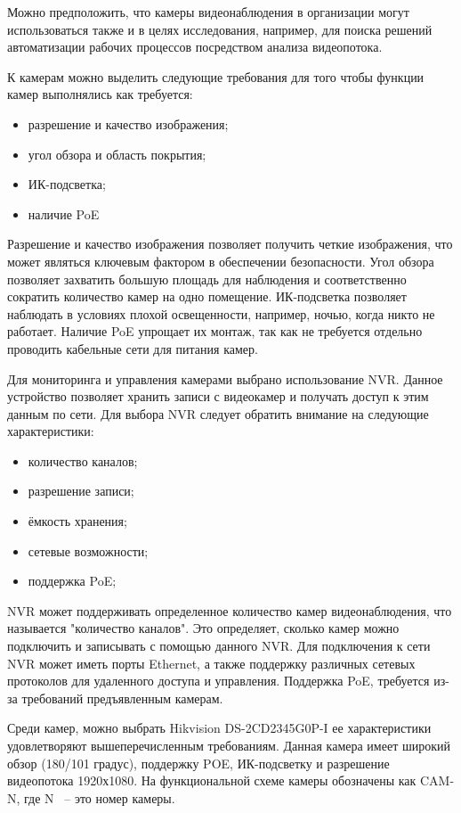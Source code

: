 Можно предположить, что камеры видеонаблюдения в организации могут использоваться также и в целях исследования, например, для 
поиска решений автоматизации рабочих процессов посредством анализа видеопотока.

К камерам можно выделить следующие требования для того чтобы функции камер выполнялись как требуется:

\begin{itemize}
    \item разрешение и качество изображения;
    \item угол обзора и область покрытия;
    \item ИК-подсветка;
    \item наличие PoE
\end{itemize}

Разрешение и качество изображения позволяет получить четкие изображения, что может являться ключевым фактором в обеспечении безопасности. 
Угол обзора позволяет захватить большую площадь для наблюдения и соответственно сократить количество камер на одно помещение.
ИК-подсветка позволяет наблюдать в условиях плохой освещенности, например, ночью, когда никто не работает. Наличие PoE упрощает их
монтаж, так как не требуется отдельно проводить кабельные сети для питания камер.

Для мониторинга и управления камерами выбрано использование NVR. Данное устройство позволяет хранить записи с видеокамер и получать
доступ к этим данным по сети.
Для выбора NVR следует обратить внимание на следующие характеристики:

\begin{itemize}
    \item количество каналов;
    \item разрешение записи;
    \item ёмкость хранения;
    \item сетевые возможности;
    \item поддержка PoE;
\end{itemize}

NVR может поддерживать определенное количество камер видеонаблюдения, 
что называется "количество каналов". Это определяет, сколько камер можно подключить и 
записывать с помощью данного NVR. Для подключения к сети NVR может иметь порты Ethernet, а также 
поддержку различных сетевых протоколов для удаленного доступа и управления. Поддержка PoE, требуется 
из-за требований предъявленным камерам. 

Среди камер, можно выбрать Hikvision DS-2CD2345G0P-I ее характеристики удовлетворяют вышеперечисленным требованиям. Данная камера имеет широкий обзор (180/101 градус),
поддержку POE, ИК-подсветку и разрешение видеопотока 1920х1080. На функциональной схеме камеры обозначены как CAM-N, где N ~-- это номер камеры.

